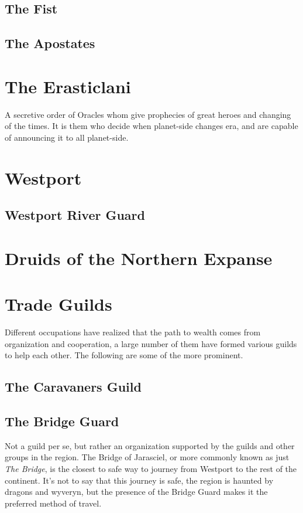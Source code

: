\documentclass[letterpaper,twocolumn,openany,nodeprecatedcode]{dndbook}
\begin{document}
    \subsection{The Fist}
    
    \subsection{The Apostates}
    
    
\section{The Erasticlani}

A secretive order of Oracles whom give prophecies of great heroes and changing of the times.  It is them who decide when planet-side changes era, and are capable of announcing it to all planet-side.

\section{Westport}
    \subsection{Westport River Guard}


\section{Druids of the Northern Expanse}

\section{Trade Guilds}
Different occupations have realized that the path to wealth comes from organization and cooperation, a large number of them have formed various guilds to help each other.  The following are some of the more prominent.
    \subsection{The Caravaners Guild}
    
    \subsection{The Bridge Guard}
    Not a guild per se, but rather an organization supported by the guilds and other groups in the region.  The Bridge of Jarasciel, or more commonly known as just \textit{The Bridge}, is the closest to safe way to journey from Westport to the rest of the continent.  It's not to say that this journey is safe, the region is haunted by dragons and wyveryn, but the presence of the Bridge Guard makes it the preferred method of travel.  
    
\end{document}
